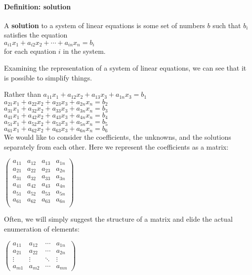 \documentclass[12pt,letterpaper,final]{article}
\begin{document}
\paragraph{Definition: solution} A \textbf{solution} to a system of linear equations is some set of numbers $b$ such that $b_i$ satisfies the equation \\
$a_{i1}x_1 + a_{i2}x_2 + \cdots + a_{in}x_n = b_i$\\
for each equation $i$ in the system. 

Examining the representation of a system of linear equations, we can see that it is possible to simplify things.

Rather than 
$a_{11}x_1 + a_{12}x_2 + a_{13}x_3  + a_{1n}x_3 = b_1$\\
$a_{21}x_1 + a_{22}x_2 + a_{23}x_3  + a_{2n}x_n = b_2$\\
$a_{31}x_1 + a_{32}x_2 + a_{33}x_3  + a_{3n}x_n = b_3$\\
$a_{41}x_1 + a_{42}x_2 + a_{43}x_3  + a_{4n}x_n = b_4$\\
$a_{51}x_1 + a_{52}x_2 + a_{53}x_3  + a_{5n}x_n = b_5$\\
$a_{61}x_1 + a_{62}x_2 + a_{63}x_3  + a_{6n}x_n = b_6$\\

We would like to consider the coefficients, the unknowns, and the solutions separately from each other. Here we represent the coefficients as a matrix:

$
 \begin{pmatrix}
a_{11} &  a_{12} &  a_{13} &   a_{1n} \\
a_{21}  & a_{22} &  a_{23} &   a_{2n}\\
a_{31} & a_{32} &   a_{33} &   a_{3n}\\   
a_{41}& a_{42} &  a_{43} &   a_{4n}\\
a_{51} &a_{52} &   a_{53} &   a_{5n}\\
a_{61} &a_{62} &   a_{63} &   a_{6n}\\
 \end{pmatrix}
$

Often, we will simply suggest the structure of a matrix and elide the actual enumeration of elements:

$
 \begin{pmatrix}
  a_{11} & a_{12} & \cdots & a_{1n} \\
  a_{21} & a_{22} & \cdots & a_{2n} \\
  \vdots  & \vdots  & \ddots & \vdots  \\
  a_{m1} & a_{m2} & \cdots & a_{mn}
 \end{pmatrix}
$
\end{document}
